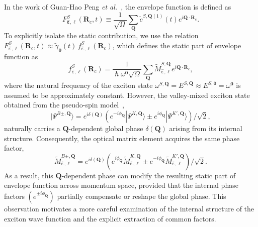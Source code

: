 In the work of Guan-Hao Peng \textit{et al.}~\cite{peng2022tailoring}, the envelope function is defined as
\begin{equation}
F^{S}_{\hat{\boldsymbol{\varepsilon}}, \ell}(\boldsymbol{R}_c,t)
\equiv
\frac{1}{\sqrt{\Omega}}
\sum_{\boldsymbol{Q}}
\tilde{c}^{S,\boldsymbol{Q}(1)}(t)
e^{i\boldsymbol{Q}\cdot\boldsymbol{R}_c}.
\label{wavepacket_envelope}
\end{equation}
To explicitly isolate the static contribution, we use the relation
$F^{S}_{\hat{\boldsymbol{\varepsilon}}, \ell}(\boldsymbol{R}_c,t)
\approx \tilde{\gamma}_{\boldsymbol{0}}(t)\, f^{S}_{\hat{\boldsymbol{\varepsilon}}, \ell}(\boldsymbol{R}_c)$,
which defines the static part of envelope function as
\begin{equation}
f^{S}_{\hat{\boldsymbol{\varepsilon}}, \ell}(\boldsymbol{R}_c)
=
\frac{1}{\hslash \omega^{\boldsymbol{0}} \sqrt{\Omega}}
\sum_{\boldsymbol{Q}}
\tilde{M}_{\hat{\boldsymbol{\varepsilon}}, \ell}^{S,\boldsymbol{Q}}
e^{i\boldsymbol{Q}\cdot\boldsymbol{R}_c},
\label{wavepacket_static}
\end{equation}
where the natural frequency of the exciton state $\omega^{S,\boldsymbol{Q}}=E^{S,\boldsymbol{Q}}\approx E^{S,\boldsymbol{0}}=\omega^{\boldsymbol{0}}$ is assumed to be approximately constant. However, the valley-mixed exciton state obtained from the pseudo-spin model~\cite{peng2022tailoring},
\begin{equation}
|\Psi^{B\pm,\boldsymbol{Q}}\rangle
=
e^{i\delta(\boldsymbol{Q})}
\left(
e^{-i\phi_{\boldsymbol{Q}}}
|\Psi^{K,\boldsymbol{Q}}\rangle
\pm
e^{i\phi_{\boldsymbol{Q}}}
|\Psi^{K',\boldsymbol{Q}}\rangle
\right) / \sqrt{2},
\label{global_phase1}
\end{equation}
naturally carries a $\boldsymbol{Q}$-dependent global phase $\delta(\boldsymbol{Q})$ arising from its internal structure. Consequently, the optical matrix element acquires the same phase factor,
\begin{equation}
\tilde{M}_{\hat{\boldsymbol{\varepsilon}}, \ell}^{B\pm,\boldsymbol{Q}}
=
e^{i\delta(\boldsymbol{Q})}
\left(
e^{i\phi_{\boldsymbol{Q}}}
\tilde{M}_{\hat{\boldsymbol{\varepsilon}}, \ell}^{K,\boldsymbol{Q}}
\pm
e^{-i\phi_{\boldsymbol{Q}}}
\tilde{M}_{\hat{\boldsymbol{\varepsilon}}, \ell}^{K',\boldsymbol{Q}}
\right) / \sqrt{2}.
\label{global_phase}
\end{equation}
As a result, this $\boldsymbol{Q}$-dependent phase can modify the resulting static part of envelope function across momentum space, provided that the internal phase factors $(e^{\pm i \phi_{\boldsymbol{Q}}})$ partially compensate or reshape the global phase. This observation motivates a more careful examination of the internal structure of the exciton wave function and the explicit extraction of common factors.

